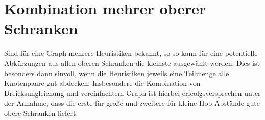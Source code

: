 \section{Kombination mehrer oberer Schranken}
Sind für eine Graph mehrere Heuristiken bekannt, so so kann für eine potentielle Abkürzungen aus allen oberen Schranken die kleinste ausgewählt werden.
Dies ist besonders dann sinvoll, wenn die Heuristiken jeweils eine Teilmenge alle Knotenpaare gut abdecken.
Insbesondere die Kombination von Dreicksungleichung und vereinfachtem Graph ist hierbei erfeolgsversprechen unter der Annahme, dass die erste für große und zweitere für kleine Hop-Abstände gute obere Schranken liefert.

% 
% 
% 
% 
% 
% 
